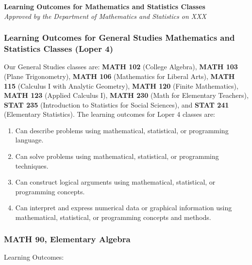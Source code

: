 \documentclass[11pt]{article}
\newenvironment{alphalist}{
  \begin{enumerate}[(1)]
    \addtolength{\itemsep}{-1.0\itemsep}}
  {\end{enumerate}}
\begin{document}
\begin{flushleft}
\textbf{Learning Outcomes for Mathematics and Statistics Classes} \\
\vspace{0.1in}
\emph{Approved by the Department of Mathematics and Statistics on XXX}
\end{flushleft}

\subsubsection*{Learning Outcomes for General Studies Mathematics and Statistics Classes (Loper 4)}

Our General Studies classes are:
\textbf{MATH 102} (College Algebra),
\textbf{MATH 103} (Plane Trigonometry),
\textbf{MATH 106} (Mathematics for Liberal Arts),
\textbf{MATH 115} (Calculus I with Analytic Geometry),
\textbf{MATH 120} (Finite Mathematics),
\textbf{MATH 123} (Applied Calculus I),
\textbf{MATH 230} (Math for Elementary Teachers),
\textbf{STAT 235} (Introduction to  Statistics for  Social Sciences),
and \textbf{STAT 241}  (Elementary Statistics). The learning outcomes for Loper 4  classes are:

\begin{alphalist}
\item Can describe problems using mathematical, statistical, or programming language.
\item Can solve problems using mathematical, statistical, or programming techniques.
\item Can construct logical arguments using mathematical, statistical, or programming concepts.
\item Can interpret and express numerical data or graphical information using mathematical, statistical, or programming concepts and methods.
\end{alphalist}

\subsubsection*{MATH 90, Elementary Algebra}

Learning Outcomes:
\end{document}
